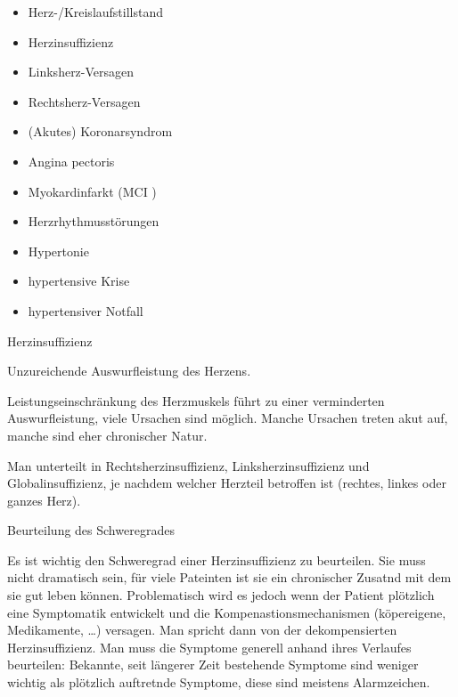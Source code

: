 \documentclass{article}
\begin{document}
\begin{itemize}
\item Herz-/Kreislaufstillstand

\item Herzinsuffizienz

\end{itemize}
\begin{itemize}
\item Linksherz-Versagen

\item Rechtsherz-Versagen

\end{itemize}
\begin{itemize}
\item (Akutes) Koronarsyndrom

\end{itemize}
\begin{itemize}
\item Angina pectoris

\item Myokardinfarkt (MCI )

\end{itemize}
\begin{itemize}
\item Herzrhythmusst\"orungen

\item Hypertonie

\end{itemize}
\begin{itemize}
\item hypertensive Krise

\item hypertensiver Notfall

\end{itemize}
Herzinsuffizienz

Unzureichende Auswurfleistung des Herzens.

Leistungseinschr\"ankung des Herzmuskels f\"uhrt zu einer verminderten
Auswurfleistung, viele Ursachen sind m\"oglich. Manche Ursachen treten
akut auf, manche sind eher chronischer Natur.

Man unterteilt in Rechtsherzinsuffizienz,
Linksherzinsuffizienz  und
Globalinsuffizienz, je nachdem welcher
Herzteil betroffen ist (rechtes, linkes oder ganzes Herz). 

Beurteilung des Schweregrades

Es ist wichtig den Schweregrad einer Herzinsuffizienz zu beurteilen. Sie
muss nicht dramatisch sein, f\"ur viele Pateinten ist sie ein
chronischer Zusatnd mit dem sie gut leben k\"onnen. Problematisch wird
es jedoch wenn der Patient pl\"otzlich eine Symptomatik entwickelt und
die Kompenastionsmechanismen (k\"opereigene, Medikamente, {\dots})
versagen. Man spricht dann von der dekompensierten Herzinsuffizienz.
Man muss die Symptome generell anhand ihres Verlaufes beurteilen:
Bekannte, seit l\"angerer Zeit bestehende Symptome sind weniger wichtig
als pl\"otzlich auftretnde Symptome, diese sind meistens Alarmzeichen. 
\end{document}
